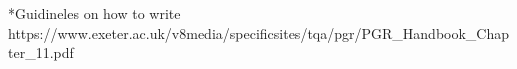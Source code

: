 *Guidineles on how  to write https://www.exeter.ac.uk/v8media/specificsites/tqa/pgr/PGR_Handbook_Chapter_11.pdf

